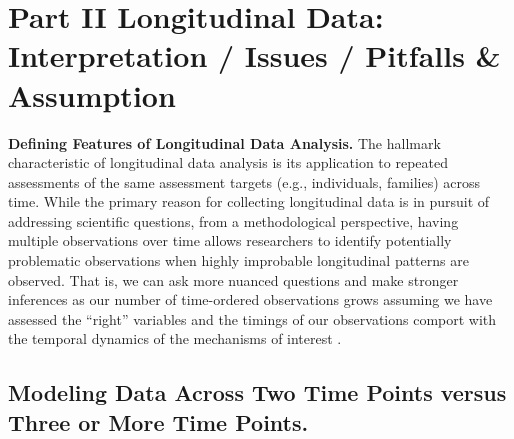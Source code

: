 \documentclass[
  10pt,
  letterpaper,
]{article}
\begin{document}
\hypertarget{part-ii-longitudinal-data-interpretation-issues-pitfalls-assumption}{%
\section{Part II Longitudinal Data: Interpretation / Issues / Pitfalls
\&
Assumption}\label{part-ii-longitudinal-data-interpretation-issues-pitfalls-assumption}}

\label{sec:headings} \textbf{Defining Features of Longitudinal Data
Analysis.} The hallmark characteristic of longitudinal data analysis is
its application to repeated assessments of the same assessment targets
(e.g., individuals, families) across time. While the primary reason for
collecting longitudinal data is in pursuit of addressing scientific
questions, from a methodological perspective, having multiple
observations over time allows researchers to identify potentially
problematic observations when highly improbable longitudinal patterns
are observed. That is, we can ask more nuanced questions and make
stronger inferences as our number of time-ordered observations grows
assuming we have assessed the ``right'' variables and the timings of our
observations comport with the temporal dynamics of the mechanisms of
interest .

\hypertarget{modeling-data-across-two-time-points-versus-three-or-more-time-points.}{%
\subsection{Modeling Data Across Two Time Points versus Three or More
Time
Points.}\label{modeling-data-across-two-time-points-versus-three-or-more-time-points.}}
\end{document}
